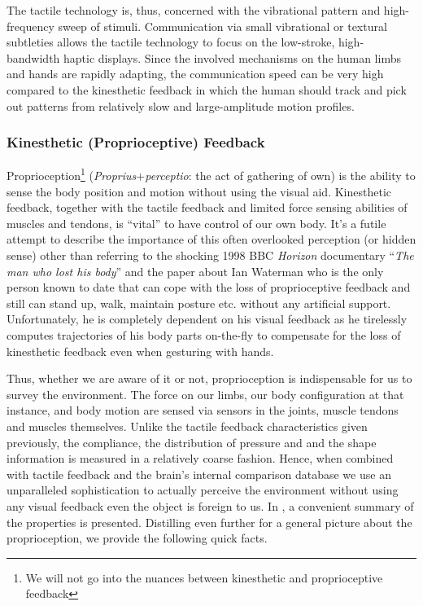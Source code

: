 The tactile technology is, thus, concerned with the vibrational pattern and high-frequency sweep of stimuli. Communication via small vibrational or textural subtleties allows the tactile technology to focus on the low-stroke, high-bandwidth haptic displays. Since the involved mechanisms on the human limbs and hands are rapidly adapting, the communication speed can be very high compared to the kinesthetic feedback in which the human should track and pick out patterns from relatively slow and large-amplitude motion profiles. 


\subsubsection{Kinesthetic (Proprioceptive) Feedback}
Proprioception\footnote{We will not go into the nuances between kinesthetic and proprioceptive feedback} (\emph{Proprius}+\emph{perceptio}: the act of gathering of own) is the ability to sense the body position and motion without using the visual aid. Kinesthetic feedback, together with the tactile feedback and limited force sensing abilities of muscles and tendons, is \enquote{vital} to have control of our own body. It's a futile attempt to describe the importance of this often overlooked perception (or hidden sense) other than referring to the shocking 1998 BBC \emph{Horizon} documentary \enquote{\emph{The man who lost his body}} and the paper \cite{waterman} about Ian Waterman who is the only person known to date that can cope with the loss of proprioceptive feedback and still can stand up, walk, maintain posture etc. without any artificial support. Unfortunately, he is completely dependent on his visual feedback as he tirelessly computes trajectories of his body parts on-the-fly to compensate for the loss of kinesthetic feedback even when gesturing with hands. 

Thus, whether we are aware of it or not, proprioception is indispensable for us to survey the environment. The force on our limbs, our body configuration at that instance, and body motion are sensed via sensors in the joints, muscle tendons and muscles themselves. Unlike the tactile feedback characteristics given previously, the compliance, the distribution of pressure and and the shape information is measured in a relatively coarse fashion. Hence, when combined with tactile feedback and the brain's internal comparison database we use an unparalleled sophistication to actually perceive the environment without using any visual feedback even the object is foreign to us. In \cite{biggssrinivasan}, a convenient summary of the properties is presented. Distilling even further for a general picture about the proprioception, we provide the following quick facts. 

